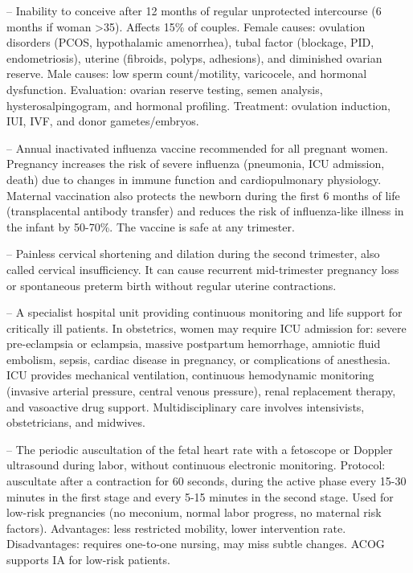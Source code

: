 -- Inability to conceive after 12 months of regular unprotected intercourse (6 months if woman >35). Affects 15\% of couples. Female causes: ovulation disorders (PCOS, hypothalamic amenorrhea), tubal factor (blockage, PID, endometriosis), uterine (fibroids, polyps, adhesions), and diminished ovarian reserve. Male causes: low sperm count/motility, varicocele, and hormonal dysfunction. Evaluation: ovarian reserve testing, semen analysis, hysterosalpingogram, and hormonal profiling. Treatment: ovulation induction, IUI, IVF, and donor gametes/embryos.

-- Annual inactivated influenza vaccine recommended for all pregnant women. Pregnancy increases the risk of severe influenza (pneumonia, ICU admission, death) due to changes in immune function and cardiopulmonary physiology. Maternal vaccination also protects the newborn during the first 6 months of life (transplacental antibody transfer) and reduces the risk of influenza-like illness in the infant by 50-70\%. The vaccine is safe at any trimester.

-- Painless cervical shortening and dilation during the second trimester, also called cervical insufficiency. It can cause recurrent mid-trimester pregnancy loss or spontaneous preterm birth without regular uterine contractions.

-- A specialist hospital unit providing continuous monitoring and life support for critically ill patients. In obstetrics, women may require ICU admission for: severe pre-eclampsia or eclampsia, massive postpartum hemorrhage, amniotic fluid embolism, sepsis, cardiac disease in pregnancy, or complications of anesthesia. ICU provides mechanical ventilation, continuous hemodynamic monitoring (invasive arterial pressure, central venous pressure), renal replacement therapy, and vasoactive drug support. Multidisciplinary care involves intensivists, obstetricians, and midwives.

-- The periodic auscultation of the fetal heart rate with a fetoscope or Doppler ultrasound during labor, without continuous electronic monitoring. Protocol: auscultate after a contraction for 60 seconds, during the active phase every 15-30 minutes in the first stage and every 5-15 minutes in the second stage. Used for low-risk pregnancies (no meconium, normal labor progress, no maternal risk factors). Advantages: less restricted mobility, lower intervention rate. Disadvantages: requires one-to-one nursing, may miss subtle changes. ACOG supports IA for low-risk patients.

